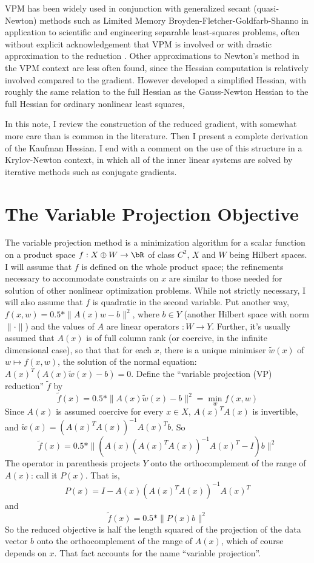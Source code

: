 VPM has been widely used in conjunction with generalized secant (quasi-Newton) methods such as Limited Memory Broyden-Fletcher-Goldfarb-Shanno \cite[]{NocedalWright} in application to scientific and engineering separable least-squares problems, often without explicit acknowledgement that VPM is involved or with drastic approximation to the reduction \cite[]{Ghattas:IP25,LeeuwenHerrmann:16,vanLeeuwenMulder:09,Warner:16}. Other approximations to Newton's method in the VPM context are less often found, since the Hessian computation is relatively involved compared to the gradient. However \cite{Kaufman:75} developed a simplified Hessian, with roughly the same relation to the full Hessian as the Gauss-Newton Hessian to the full Hessian for ordinary nonlinear least squares, 

In this note, I review the construction of the reduced gradient, with somewhat more care than is common in the literature. Then I present a complete derivation of the Kaufman Hessian. I end with a comment on the use of this structure in a Krylov-Newton context, in which all of the inner linear systems are solved by iterative methods such as conjugate gradients. 

\section{The Variable Projection Objective}
The variable projection method is a minimization algorithm for a scalar function on a product space $f:X \oplus W \rightarrow \bR$ of class $C^2$, $X$ and $W$ being Hilbert spaces. I will assume that $f$ is defined on the whole product space; the refinements necessary to accommodate constraints on $x$ are similar to those needed for solution of other nonlinear optimization problems. While not strictly necessary, I will also assume that $f$ is quadratic in the second variable. Put another way, $f(x,w) = 0.5*\|A(x)w-b\|^2$, where $b \in Y$ (another Hilbert space with norm $\|\cdot\|$) and the values of $A$ are linear operators $: W \rightarrow Y$. Further, it's usually assumed that $A(x)$ is of full column rank (or coercive, in the infinite dimensional case), so that that for each $x$, there is a unique minimiser $\tilde{w}(x)$ of $w \mapsto f(x,w)$, the solution of the normal equation: $A(x)^T(A(x)\tilde{w}(x) - b)=0$. Define the ``variable projection (VP) reduction'' $\tilde{f}$ by 
$$
\tilde{f}(x) = 0.5*\|A(x)\tilde{w}(x)-b\|^2= \min_w f(x,w)
$$
Since $A(x)$ is assumed coercive for every $x \in X$, $A(x)^TA(x)$ is invertible, and $\tilde{w}(x) = (A(x)^TA(x))^{-1}A(x)^Tb$. So
$$ 
\tilde{f}(x) = 0.5*\|(A(x)(A(x)^TA(x))^{-1}A(x)^T - I)b\|^2
$$
The operator in parenthesis projects $Y$ onto the orthocomplement of the range of $A(x)$: call it $P(x)$. That is,
\begin{equation}
  \label{eqn:proj}
P(x) = I-A(x)(A(x)^TA(x))^{-1}A(x)^T
\end{equation}
and
$$
\tilde{f}(x) = 0.5*\|P(x)b\|^2
$$
So the reduced objective is half the length squared of the projection of the data vector $b$ onto the orthocomplement of the range of $A(x)$, which of course depends on $x$. That fact accounts for the name ``variable projection''.

